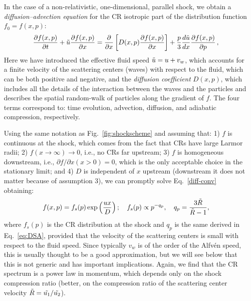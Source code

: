 \documentclass[varenna]{cimento}
\newcommand{\alf}{Alfv\'en }
\newcommand{\de}{\partial}
\begin{document}
In the case of a non-relativistic, one-dimensional, parallel shock, we obtain a \emph{diffusion--advection equation} for the CR isotropic part of the distribution function $f_0=f(x,p)$:
\begin{equation}\label{diff-conv}
	\frac{\de f(x,p)}{\de t}+\Tilde{u}\frac{\de f(x,p)}{\de x}=\frac{\de}{\de x}\left[D(x,p)\frac{\de f(x,p)}{\de x}\right]+
	\frac{p}{3}\frac{d\Tilde{u}}{dx}\frac{\de f(x,p)}{\de p}\,,
\end{equation}
Here we have introduced the effective fluid speed $\Tilde{u}=u+v_w$, which accounts for a finite velocity of the scattering centers (waves) with respect to the fluid, which can be both positive and negative, and the \emph{diffusion coefficient} $D(x,p)$, which includes all the details of the interaction between the waves and the particles and describes the spatial random-walk of particles along the gradient of $f$.
The four terms correspond to: time evolution, advection, diffusion, and adiabatic compression, respectively.

Using the same notation as Fig.~\ref{fig:shockscheme} and assuming that: 
1) $f$ is continuous at the shock, which comes from the fact that CRs have large Larmor radii; 
2) $f(x\to\infty)\to 0$, i.e., no CRs far upstream;
3) $f$ is homogeneous downstream, i.e., $\de f/\de x(x>0)=0 $, which is the only acceptable choice in the stationary limit; 
and 
4) $D$ is independent of $x$ upstream (downstream it does not matter because of assumption 3),
we can promptly solve Eq.~\ref{diff-conv} obtaining:
\begin{equation}
    f(x,p)= f_s(p)\exp\left(\frac{ux}{D} \right); \quad f_s(p)\propto p^{-q_p},\quad  q_p=\frac{3\Tilde{R}}{\Tilde{R}-1},
\end{equation}
where $f_s(p)$ is the CR distribution at the shock and $q_p$ is the same derived in Eq.~\ref{eq:DSA}, provided that the velocity of the scattering centers is small with respect to the fluid speed.
Since typically $v_w$ is of the order of the \alf speed, this is usually thought to be a good approximation, but we will see below that this is not generic and has important implications.
Again, we find that the CR spectrum is a power law in momentum, which depends only on the shock compression ratio (better, on the compression ratio of the scattering center velocity $\Tilde{R}=\Tilde{u_1}/\Tilde{u_2}$).
\end{document}
